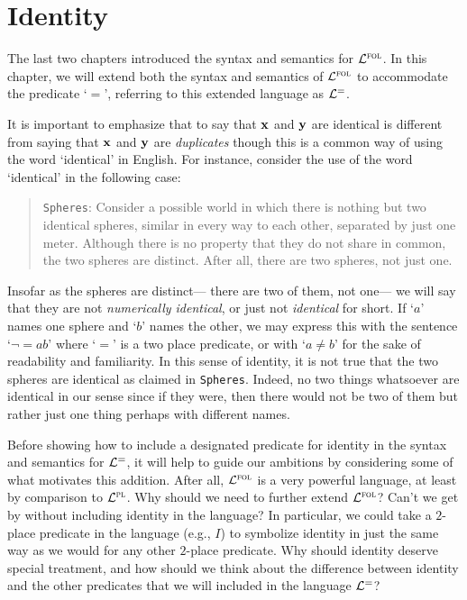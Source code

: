 ﻿%
\chapter{Identity}
  \label{ch.FOL-identity}

The last two chapters introduced the syntax and semantics for $\mathcal{L}^{\textsc{fol}}$.
In this chapter, we will extend both the syntax and semantics of $\mathcal{L}^{\textsc{fol}}$ to accommodate the  predicate `$=$', referring to this extended language as $\mathcal{L}^{=}$.

It is important to emphasize that to say that $\mathbf{x}$ and $\mathbf{y}$ are identical is different from saying that $\mathbf{x}$ and $\mathbf{y}$ are \textit{duplicates} though this is a common way of using the word `identical' in English.
For instance, consider the use of the word `identical' in the following case:

  \begin{quote}
    \texttt{Spheres}: Consider a possible world in which there is nothing but two identical spheres, similar in every way to each other, separated by just one meter.
    Although there is no property that they do not share in common, the two spheres are distinct.
    After all, there are two spheres, not just one.
  \end{quote}

Insofar as the spheres are distinct--- there are two of them, not one--- we will say that they are not \textit{numerically identical}, or just not \textit{identical} for short.
If `$a$' names one sphere and `$b$' names the other, we may express this with the sentence `$\neg{=}ab$' where `$=$' is a two place predicate, or with `$a\neq b$' for the sake of readability and familiarity.
In this sense of identity, it is not true that the two spheres are identical as claimed in \texttt{Spheres}.
Indeed, no two things whatsoever are identical in our sense since if they were, then there would not be two of them but rather just one thing perhaps with different names.

Before showing how to include a designated predicate for identity in the syntax and semantics for $\mathcal{L}^{=}$, it will help to guide our ambitions by considering some of what motivates this addition.
After all, $\mathcal{L}^{\textsc{fol}}$ is a very powerful language, at least by comparison to $\mathcal{L}^{\textsc{pl}}$.
Why should we need to further extend $\mathcal{L}^{\textsc{fol}}$?
Can't we get by without including identity in the language?
In particular, we could take a $2$-place predicate in the language (e.g., $I$) to symbolize identity in just the same way as we would for any other $2$-place predicate.
Why should identity deserve special treatment, and how should we think about the difference between identity and the other predicates that we will included in the language $\mathcal{L}^{=}$?



